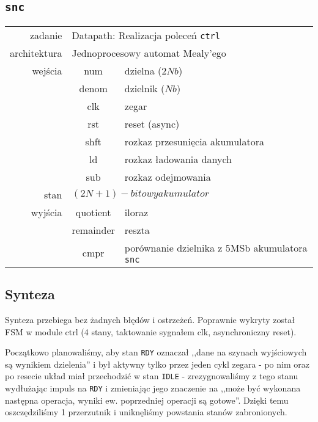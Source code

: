 \documentclass[a4paper]{article}
\begin{document}
\subsection{\texttt{snc}}
\begin{table}[!h]
	\begin{tabular}{r|c l}
		zadanie      & \multicolumn{2}{l}{Datapath: Realizacja poleceń \texttt{ctrl}} \\
		architektura & \multicolumn{2}{l}{Jednoprocesowy automat Mealy'ego}           \\
		\hline
		wejścia      & num      & dzielna  ($2N b$) \\
		             & denom    & dzielnik ($N b$)  \\
		             & clk      & zegar             \\
		             & rst      & reset (async)     \\
		             & shft     & rozkaz przesunięcia akumulatora \\
		             & ld       & rozkaz ładowania danych \\
		             & sub      & rozkaz odejmowania      \\
		\hline
		stan         & \multicolumn{2}{l}{$(2N+1)-bitowy akumulator$} \\
		\hline
		wyjścia      & quotient    & iloraz \\
		             & remainder   & reszta \\
		             & cmpr        & porównanie dzielnika z 5MSb akumulatora \texttt{snc} \\
	\end{tabular}
\end{table}
\subsection{Synteza}
Synteza przebiega bez żadnych błędów i ostrzeżeń.
Poprawnie wykryty został FSM w module ctrl (4 stany, taktowanie sygnałem clk, asynchroniczny reset).

Początkowo planowaliśmy, aby stan \texttt{RDY} oznaczał ,,dane na szynach wyjściowych są wynikiem dzielenia'' i był aktywny tylko przez jeden cykl zegara - po nim oraz po resecie układ miał przechodzić w stan \texttt{IDLE} - zrezygnowaliśmy z tego stanu wydłużając impuls na \texttt{RDY} i zmieniając jego znaczenie na ,,może być wykonana następna operacja, wyniki ew. poprzedniej operacji są gotowe''.
Dzięki temu oszczędziliśmy 1 przerzutnik i uniknęliśmy powstania stanów zabronionych.
\end{document}
